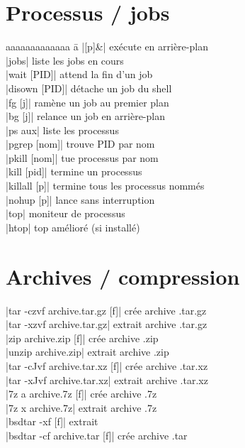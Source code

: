 \documentclass{article}
\newenvironment{cmdblock}{%
  \par\setlength{\parindent}{0pt}\setlength{\parskip}{0pt}%
  \RaggedRight%
}{\par}
\begin{document}
\begin{multicols}{4}
    \section*{Processus / jobs}
    \begin{tabbing}
        aaaaaaaaaaaaa \= a \kill
        \code|[p]&| \> exécute en arrière-plan \\
        \code|jobs| \> liste les jobs en cours \\
        \code|wait [PID]| \> attend la fin d'un job \\
        \code|disown [PID]| \> détache un job du shell \\
        \code|fg [j]| \> ramène un job au premier plan \\
        \code|bg [j]| \> relance un job en arrière-plan \\
        \code|ps aux| \> liste les processus \\
        \code|pgrep [nom]| \> trouve PID par nom \\
        \code|pkill [nom]| \> tue processus par nom \\
        \code|kill [pid]| \> termine un processus \\
        \code|killall [p]| \> termine tous les processus nommés \\
        \code|nohup [p]| \> lance sans interruption \\
        \code|top| \> moniteur de processus \\
        \code|htop| \> top amélioré (si installé)

    \end{tabbing}

    \section*{Archives / compression}
    \begin{cmdblock}
        \code|tar -czvf archive.tar.gz [f]| \quad crée archive .tar.gz \\
        \code|tar -xzvf archive.tar.gz| \quad extrait archive .tar.gz \\
        \code|zip archive.zip [f]| \quad crée archive .zip \\
        \code|unzip archive.zip| \quad extrait archive .zip \\
        \code|tar -cJvf archive.tar.xz [f]| \quad crée archive .tar.xz \\
        \code|tar -xJvf archive.tar.xz| \quad extrait archive .tar.xz \\
        \code|7z a archive.7z [f]| \quad crée archive .7z \\
        \code|7z x archive.7z| \quad extrait archive .7z \\
        \code|bsdtar -xf [f]| \quad extrait \\
        \code|bsdtar -cf archive.tar [f]| \quad crée archive .tar \\
    \end{cmdblock}


\end{multicols}
\end{document}
